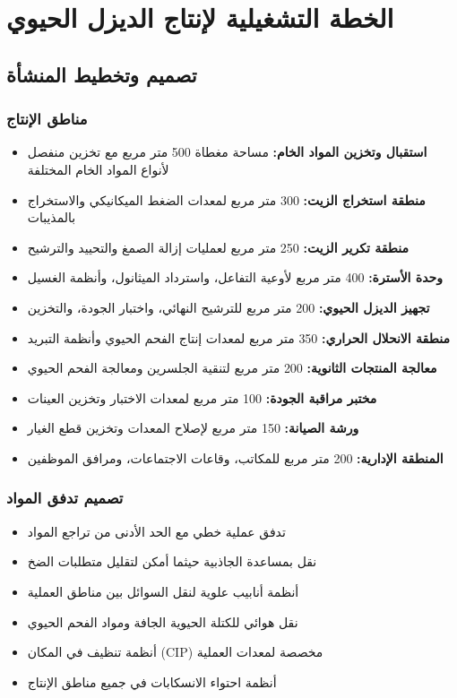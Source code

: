 \section{الخطة التشغيلية لإنتاج الديزل الحيوي}

\subsection{تصميم وتخطيط المنشأة}

\subsubsection{مناطق الإنتاج}
\begin{itemize}
    \item \textbf{استقبال وتخزين المواد الخام:} مساحة مغطاة 500 متر مربع مع تخزين منفصل لأنواع المواد الخام المختلفة
    \item \textbf{منطقة استخراج الزيت:} 300 متر مربع لمعدات الضغط الميكانيكي والاستخراج بالمذيبات
    \item \textbf{منطقة تكرير الزيت:} 250 متر مربع لعمليات إزالة الصمغ والتحييد والترشيح
    \item \textbf{وحدة الأسترة:} 400 متر مربع لأوعية التفاعل، واسترداد الميثانول، وأنظمة الغسيل
    \item \textbf{تجهيز الديزل الحيوي:} 200 متر مربع للترشيح النهائي، واختبار الجودة، والتخزين
    \item \textbf{منطقة الانحلال الحراري:} 350 متر مربع لمعدات إنتاج الفحم الحيوي وأنظمة التبريد
    \item \textbf{معالجة المنتجات الثانوية:} 200 متر مربع لتنقية الجلسرين ومعالجة الفحم الحيوي
    \item \textbf{مختبر مراقبة الجودة:} 100 متر مربع لمعدات الاختبار وتخزين العينات
    \item \textbf{ورشة الصيانة:} 150 متر مربع لإصلاح المعدات وتخزين قطع الغيار
    \item \textbf{المنطقة الإدارية:} 200 متر مربع للمكاتب، وقاعات الاجتماعات، ومرافق الموظفين
\end{itemize}

\subsubsection{تصميم تدفق المواد}
\begin{itemize}
    \item تدفق عملية خطي مع الحد الأدنى من تراجع المواد
    \item نقل بمساعدة الجاذبية حيثما أمكن لتقليل متطلبات الضخ
    \item أنظمة أنابيب علوية لنقل السوائل بين مناطق العملية
    \item نقل هوائي للكتلة الحيوية الجافة ومواد الفحم الحيوي
    \item أنظمة تنظيف في المكان (CIP) مخصصة لمعدات العملية
    \item أنظمة احتواء الانسكابات في جميع مناطق الإنتاج
\end{itemize}

